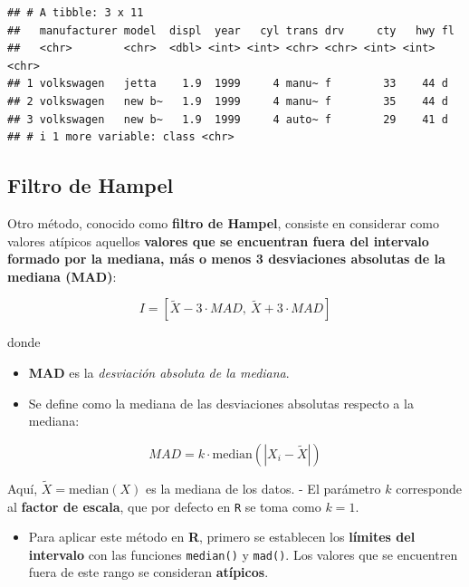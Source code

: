 \documentclass[
]{book}
\providecommand{\tightlist}{%
  \setlength{\itemsep}{0pt}\setlength{\parskip}{0pt}}
\begin{document}
\begin{verbatim}
## # A tibble: 3 x 11
##   manufacturer model  displ  year   cyl trans drv     cty   hwy fl   
##   <chr>        <chr>  <dbl> <int> <int> <chr> <chr> <int> <int> <chr>
## 1 volkswagen   jetta    1.9  1999     4 manu~ f        33    44 d    
## 2 volkswagen   new b~   1.9  1999     4 manu~ f        35    44 d    
## 3 volkswagen   new b~   1.9  1999     4 auto~ f        29    41 d    
## # i 1 more variable: class <chr>
\end{verbatim}

\subsection{Filtro de Hampel}\label{filtro-de-hampel}

Otro método, conocido como \textbf{filtro de Hampel}, consiste en considerar como valores atípicos aquellos \textbf{valores que se encuentran fuera del intervalo formado por la mediana, más o menos 3 desviaciones absolutas de la mediana (MAD)}:

\[
I = [ \tilde{X} - 3 \cdot MAD, \ \tilde{X} + 3 \cdot MAD ]
\]

donde

\begin{itemize}
\tightlist
\item
  \textbf{MAD} es la \emph{desviación absoluta de la mediana}.\\
\item
  Se define como la mediana de las desviaciones absolutas respecto a la mediana:
\end{itemize}

\[
MAD = k \cdot \text{median} \left( |X_i - \tilde{X}| \right)
\]

Aquí, \(\tilde{X} = \text{median}(X)\) es la mediana de los datos.
- El parámetro \(k\) corresponde al \textbf{factor de escala}, que por defecto en \texttt{R} se toma como \(k = 1\).

\begin{itemize}
\tightlist
\item
  Para aplicar este método en \textbf{R}, primero se establecen los \textbf{límites del intervalo} con las funciones \texttt{median()} y \texttt{mad()}. Los valores que se encuentren fuera de este rango se consideran \textbf{atípicos}.
\end{itemize}
\end{document}
